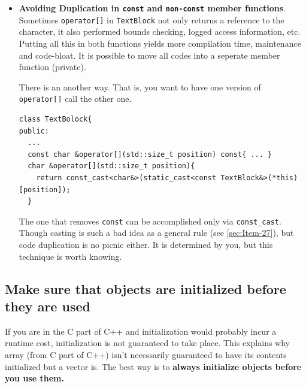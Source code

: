 \documentclass[a4paper,twoside]{article}
\theoremstyle{definition}
\theoremstyle{remark}
\numberwithin{equation}{section}
\let\OldTexttt\texttt
\renewcommand{\texttt}[1]{{\color{blue} \OldTexttt{#1}}}
\begin{document}
\begin{itemize}
\item \textbf{Avoiding Duplication in \texttt{const} and
    \texttt{non-const} member functions}. Sometimes
  \texttt{operator[]} in \texttt{TextBlock} not only returns a
  reference to the character, it also performed bounds checking,
  logged access information, etc. Putting all this in both functions
  yields more compilation time, maintenance and code-bloat. It is
  possible to move all codes into a seperate member function
  (private).

  There is an another way. That is, you want to have one version of
  \texttt{operator[]} call the other one.
\begin{verbatim}
class TextBolock{
public:
  ...
  const char &operator[](std::size_t position) const{ ... }
  char &operator[](std::size_t position){
    return const_cast<char&>(static_cast<const TextBlock&>(*this)[position]);
  }
\end{verbatim}
  The one that removes \texttt{const} can be accomplished only via
  \texttt{const\_cast}. Though casting is such a bad idea as a general
  rule (see \ref{sec:Item-27}), but code duplication is no picnic
  either. It is determined by you, but this technique is worth knowing.
\end{itemize}

\subsection{Make sure that objects are initialized before they are used}
\label{sec:Item-4}

If you are in the C part of C++ and initialization would probably
incur a runtime cost, initialization is not guaranteed to take
place. This explains why array (from C part of C++) isn't necessarily
guaranteed to have its contents initialized but a vector is.
The best way is to \textbf{always initialize objects before you use
  them.}
\end{document}

